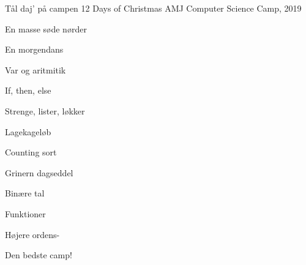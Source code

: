 \begin{song}{Tål daj' på campen}
  {} %
  {12 Days of Christmas} %
  {AMJ} %
  {Computer Science Camp, 2019} %
  {\NotCCLIed} %

  \let\oldSBVerseCnt\theSBVerseCnt

  \renewcommand{\theSBVerseCnt}{$\texttt{l[\oldSBVerseCnt]}$}
  \begin{SBVerse}
    En masse søde nørder
  \end{SBVerse}

  \begin{SBVerse}
    En morgendans
  \end{SBVerse}

  \begin{SBVerse}
    Var og aritmitik
  \end{SBVerse}

  \begin{SBVerse}
    If, then, else
  \end{SBVerse}
  
  \begin{SBVerse}
    Strenge, lister, løkker
  \end{SBVerse}
  
  \begin{SBVerse}
    Lagekageløb
  \end{SBVerse}

  \begin{SBVerse}
    Counting sort
  \end{SBVerse}
  
  \begin{SBVerse}
    Grinern dagseddel
  \end{SBVerse}
  
  \begin{SBVerse}
    Binære tal
  \end{SBVerse}
  
  \begin{SBVerse}
    Funktioner
  \end{SBVerse}
  
  \begin{SBVerse}
    Højere ordens-
  \end{SBVerse}

  \begin{SBVerse}
    Den bedste camp!
  \end{SBVerse}


\end{song}
